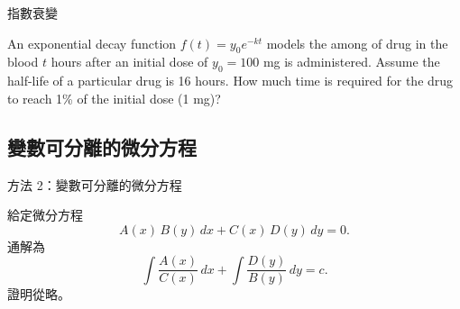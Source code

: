 \documentclass{beamer}
\newcommand  {\e}{\textup e}
\newcommand{\negskip}{\vskip -2em plus 3pt minus 3pt}
\theoremstyle{remark}
\begin{document}
\begin{CJK}{UTF8}{bsmi}
\begin{frame}{指數衰變}
  \begin{example}
    An exponential decay function $f(t) = y_0 e^{-kt}$ models the among of drug in the blood $t$ hours after an initial
    dose of $y_0 = 100$ mg is administered. Assume the half-life of a particular drug is 16 hours. How much time is
    required for the drug to reach 1\% of the initial dose (1 mg)?
  \end{example}
\end{frame}

\subsection[變數可分離]{變數可分離的微分方程}
\begin{frame}{方法 2：變數可分離的微分方程}
  \begin{theorem}
    給定微分方程
    \[A(x)\,B(y)\,dx + C(x)\,D(y)\,dy = 0.\]
    通解為
    \[\int \frac{A(x)}{C(x)}\,dx + \int \frac{D(y)}{B(y)}\,dy = c.\]
    證明從略。
  \end{theorem}
\end{frame}


\end{CJK}
\end{document}
